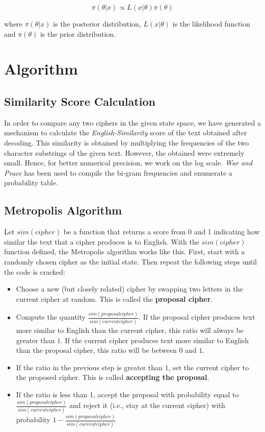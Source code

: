\documentclass{article}
\begin{document}
$$\pi(\theta|x) \propto L(x|\theta) \pi(\theta)$$

where $\pi(\theta|x)$ is the posterior distribution, $L(x|\theta)$ is the likelihood function and $\pi(\theta)$ is the prior distribution.

\section{Algorithm}
\subsection{Similarity Score Calculation}

In order to compare any two ciphers in the given state space, we have generated a mechanism to calculate the \emph{English-Similarity} score of the text obtained after decoding.
This similarity is obtained by multiplying the frequencies of the two character substrings of the given text. However, the obtained were extremely small. Hence, for better numerical precision, we work on the log scale. \emph{War and Peace} has been used to compile the bi-gram frequencies and enumerate a probability table.

\subsection{Metropolis Algorithm}
Let $sim(cipher)$ be a function that returns a score from 0 and 1 indicating how similar the text that a cipher produces is to English. With the $sim(cipher)$ function defined, the Metropolis algorithm works like this. First, start with a randomly chosen cipher as the initial state. Then repeat the following steps until the code is cracked:
\begin{itemize}
    \item Choose a new (but closely related) cipher by swapping two letters in the current cipher at random. This is called the \textbf{proposal cipher}.
    \item Compute the quantity $\frac{sim(proposal cipher)}{sim(current cipher)}$. If the proposal cipher produces text more similar to English than the current cipher, this ratio will always be greater than $1$. If the current cipher produces text more similar to English than the proposal cipher, this ratio will be between $0$ and $1$.
    \item If the ratio in the previous step is greater than $1$, set the current cipher to the proposed cipher. This is called \textbf{accepting the proposal}.
    \item If the ratio is less than 1, accept the proposal with probability equal to $\frac{sim(proposal cipher)}{sim(current cipher)}$ and reject it (i.e., stay at the current cipher) with probability $1 - \frac{sim(proposal cipher)}{sim(current cipher)}$
\end{itemize}
\end{document}
